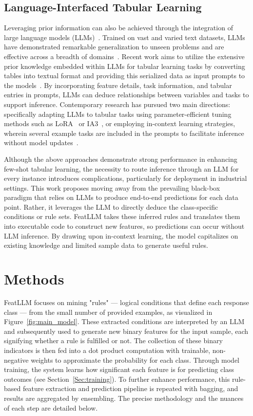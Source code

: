 \subsection{Language-Interfaced Tabular Learning} Leveraging prior information can also be achieved through the integration of large language models (LLMs)~\cite{anil2023palm,openai2023gpt4}. Trained on vast and varied text datasets, LLMs have demonstrated remarkable generalization to unseen problems and are effective across a breadth of domains~\cite{brown2020language}. Recent work aims to utilize the extensive prior knowledge embedded within LLMs for tabular learning tasks by converting tables into textual format and providing this serialized data as input prompts to the models~\cite{dinh2022lift,hegselmann2023tabllm,wang2023anypredict}. By incorporating feature details, task information, and tabular entries in prompts, LLMs can deduce relationships between variables and tasks to support inference. Contemporary research has pursued two main directions: specifically adapting LLMs to tabular tasks using parameter-efficient tuning methods such as LoRA~\cite{hu2021lora} or IA3~\cite{liu2022few}, or employing in-context learning strategies, wherein several example tasks are included in the prompts to facilitate inference without model updates~\cite{dinh2022lift,hegselmann2023tabllm,nam2023semi,slack2023tablet}.

Although the above approaches demonstrate strong performance in enhancing few-shot tabular learning, the necessity to route inference through an LLM for every instance introduces complications, particularly for deployment in industrial settings. This work proposes moving away from the prevailing black-box paradigm that relies on LLMs to produce end-to-end predictions for each data point. Rather, it leverages the LLM to directly deduce the class-specific conditions or rule sets. \textsf{FeatLLM} takes these inferred rules and translates them into executable code to construct new features, so predictions can occur without LLM inference. By drawing upon in-context learning, the model capitalizes on existing knowledge and limited sample data to generate useful rules.

\section{Methods}
\textsf{FeatLLM} focuses on mining "rules" — logical conditions that define each response class — from the small number of provided examples, as visualized in Figure~\ref{fig:main_model}. These extracted conditions are interpreted by an LLM and subsequently used to generate new binary features for the input sample, each signifying whether a rule is fulfilled or not. The collection of these binary indicators is then fed into a dot product computation with trainable, non-negative weights to approximate the probability for each class. Through model training, the system learns how significant each feature is for predicting class outcomes (see Section~\ref{Sec:training}). To further enhance performance, this rule-based feature extraction and prediction pipeline is repeated with bagging, and results are aggregated by ensembling. The precise methodology and the nuances of each step are detailed below.

